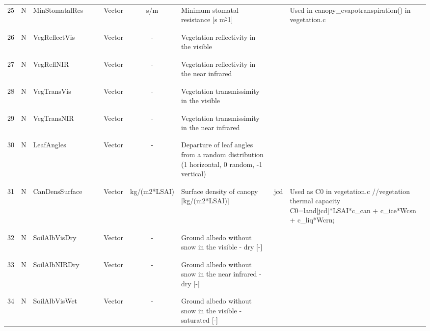 \begin{longtable}{|c|c|l|c|c|c|c|p{}|c|p{}|}
25 & N & MinStomatalRes & & & Vector & s/m & Minimum stomatal resistance [s m\^-1] &  & Used in canopy\_evapotranspiration() in vegetation.c \\
&&&&&&&&&\\\hline%
&&&&&&&&&\\
26 & N & VegReflectVis & & & Vector & - & \parbox[c]{\hsize}{Vegetation reflectivity in the visible} & & \\
&&&&&&&&&\\\hline%
&&&&&&&&&\\
27 & N & VegReflNIR & & & Vector & - & \parbox[c]{\hsize}{Vegetation reflectivity in the near infrared} & & \\
&&&&&&&&&\\\hline%
&&&&&&&&&\\
28 & N & VegTransVis & & & Vector & - & \parbox[c]{\hsize}{Vegetation transmissimity in the visible} & & \\
&&&&&&&&&\\\hline%
&&&&&&&&&\\
29 & N & VegTransNIR & & & Vector & - & \parbox[c]{\hsize}{Vegetation transmissimity in the near infrared} & & \\
&&&&&&&&&\\\hline%
&&&&&&&&&\\
30 & N & LeafAngles & & & Vector & - & \parbox[c]{\hsize}{Departure of leaf angles from a random distribution (1 horizontal, 0 random, -1 vertical)} & & \\
&&&&&&&&&\\\hline%
&&&&&&&&&\\
31 & N & CanDensSurface & & & Vector & kg/(m2*LSAI) & Surface density of canopy [kg/(m2*LSAI)] & jcd & \parbox[c]{\hsize}{Used as C0 in vegetation.c //vegetation thermal capacity
C0=land[jcd]*LSAI*c\_can + c\_ice*Wcsn + c\_liq*Wcrn;} \\
&&&&&&&&&\\\hline%
&&&&&&&&&\\
32 & N & SoilAlbVisDry & & & Vector & - & \parbox[c]{\hsize}{Ground albedo without snow in the visible - dry [-]} & & \\
&&&&&&&&&\\\hline%
&&&&&&&&&\\
33 & N & SoilAlbNIRDry & & & Vector & - & \parbox[c]{\hsize}{Ground albedo without snow in the near infrared - dry [-]} & & \\
&&&&&&&&&\\\hline%
&&&&&&&&&\\
34 & N & SoilAlbVisWet & & & Vector & - & \parbox[c]{\hsize}{Ground albedo without snow in the visible - saturated [-]} & & \\

\end{longtable}
